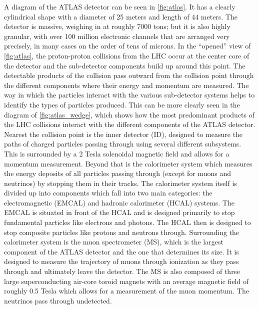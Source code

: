 A diagram of the ATLAS detector can be seen in \fig\ref{fig:atlas}.
It has a clearly cylindrical shape with a diameter of 25 meters
and length of 44 meters. The detector is massive, weighing
in at roughly 7000 tons; but it is also highly granular, with
over 100 million electronic channels that are arranged very precisely, 
in many cases on the order of tens of microns.
In the ``opened'' view of \fig\ref{fig:atlas}, the proton-proton
collisions from the LHC occur at the center core of the detector
and the sub-detector components build up around this point.
The detectable products of the collision pass outward from the collision
point through the different components where their energy and momentum
are measured. The way in which the particles interact with the various
sub-detector systems helps to identify the types of 
particles produced.
This can be more clearly seen in the diagram of 
\fig\ref{fig:atlas_wedge}, which shows how the most predominant
products of the LHC collisions interact with the different
components of the ATLAS detector.
Nearest the collision point is the inner detector (ID), designed to 
measure the paths of charged particles passing through using several
different subsystems. This 
is surrounded by a 2 Tesla solenoidal magnetic field and
allows for a momentum measurement.
Beyond that is the calorimeter system
which measures the energy deposits of all particles passing 
through (except for muons and neutrinos) by stopping them in their 
tracks. The calorimeter system 
itself is divided up into components which fall into two main 
categories: the electromagnetic (EMCAL)
and hadronic calorimeter (HCAL) systems.
The EMCAL is situated in front of the HCAL and is designed
primarily to stop fundamental particles like electrons and photons. 
The HCAL then is designed to stop
composite particles like protons and neutrons through.
Surrounding the calorimeter system is the muon spectrometer (MS),
which is the largest component of the ATLAS detector and the one
that determines its size. It is designed to measure the 
trajectory of muons through ionization as they pass through
and ultimately leave the detector. The MS is also composed of 
three large superconducting air-core toroid magnets with an 
average magnetic field of roughly 0.5 Tesla which allows for
a measurement of the muon momentum. The neutrinos 
pass through undetected.

